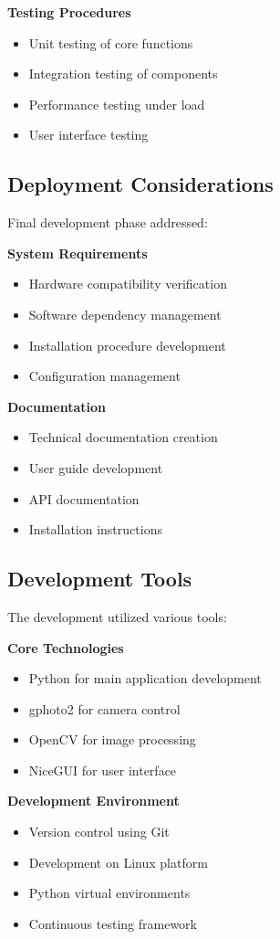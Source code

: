\textbf{Testing Procedures}
\begin{itemize}
    \item Unit testing of core functions
    \item Integration testing of components
    \item Performance testing under load
    \item User interface testing
\end{itemize}

\subsection{Deployment Considerations}
Final development phase addressed:

\textbf{System Requirements}
\begin{itemize}
    \item Hardware compatibility verification
    \item Software dependency management
    \item Installation procedure development
    \item Configuration management
\end{itemize}

\textbf{Documentation}
\begin{itemize}
    \item Technical documentation creation
    \item User guide development
    \item API documentation
    \item Installation instructions
\end{itemize}

\subsection{Development Tools}
The development utilized various tools:

\textbf{Core Technologies}
\begin{itemize}
    \item Python for main application development
    \item gphoto2 for camera control
    \item OpenCV for image processing
    \item NiceGUI for user interface
\end{itemize}

\textbf{Development Environment}
\begin{itemize}
    \item Version control using Git
    \item Development on Linux platform
    \item Python virtual environments
    \item Continuous testing framework
\end{itemize}


